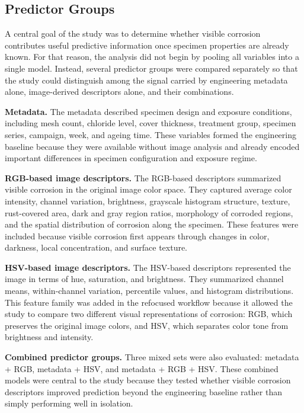 \documentclass[conference]{IEEEtran}
\begin{document}
\subsection{Predictor Groups}
A central goal of the study was to determine whether visible corrosion contributes useful predictive information once specimen properties are already known. For that reason, the analysis did not begin by pooling all variables into a single model. Instead, several predictor groups were compared separately so that the study could distinguish among the signal carried by engineering metadata alone, image-derived descriptors alone, and their combinations.

\textbf{Metadata.} The metadata described specimen design and exposure conditions, including mesh count, chloride level, cover thickness, treatment group, specimen series, campaign, week, and ageing time. These variables formed the engineering baseline because they were available without image analysis and already encoded important differences in specimen configuration and exposure regime.

\textbf{RGB-based image descriptors.} The RGB-based descriptors summarized visible corrosion in the original image color space. They captured average color intensity, channel variation, brightness, grayscale histogram structure, texture, rust-covered area, dark and gray region ratios, morphology of corroded regions, and the spatial distribution of corrosion along the specimen. These features were included because visible corrosion first appears through changes in color, darkness, local concentration, and surface texture.

\textbf{HSV-based image descriptors.} The HSV-based descriptors represented the image in terms of hue, saturation, and brightness. They summarized channel means, within-channel variation, percentile values, and histogram distributions. This feature family was added in the refocused workflow because it allowed the study to compare two different visual representations of corrosion: RGB, which preserves the original image colors, and HSV, which separates color tone from brightness and intensity.

\textbf{Combined predictor groups.} Three mixed sets were also evaluated: metadata + RGB, metadata + HSV, and metadata + RGB + HSV. These combined models were central to the study because they tested whether visible corrosion descriptors improved prediction beyond the engineering baseline rather than simply performing well in isolation.
\end{document}
